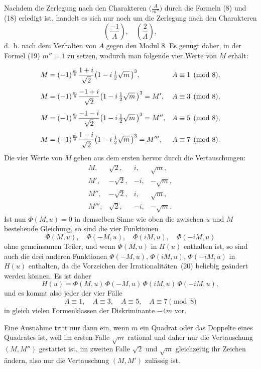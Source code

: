 \documentclass[12pt,a4paper]{article}
\theoremstyle{definition}
\begin{document}
Nachdem die Zerlegung nach den Charakteren $\bigl(\frac{A}{m''}\bigr)$ durch 
die Formeln (8) und (18) erledigt ist, handelt es sich nur noch um die 
Zerlegung nach den Charakteren
\[
\left(\frac{-1}{A}\right),\quad \left(\frac{2}{A}\right),
\]
d.~h. nach dem Verhalten von $A$ gegen den Modul $8$. Es genügt daher, in 
der Formel (19) $m'' = 1$ zu setzen, wodurch man folgende vier Werte von 
$M$ erhält:

\begin{align}
M &= (-1)^{\frac{m}{8}} \frac{1+i}{\sqrt{2}}
\bigl(1 - i\,\tfrac{1}{2}\sqrt{m}\,\bigr)^{3}, & A &\equiv 1 \pmod 8,\notag\\[4pt]
M &= (-1)^{\frac{m}{8}} \frac{-1+i}{\sqrt{2}}
\bigl(1 - i\,\tfrac{1}{2}\sqrt{m}\,\bigr)^{3} = M', & A &\equiv 3 \pmod 8,\notag\\[4pt]
M &= (-1)^{\frac{m}{8}} \frac{-1-i}{\sqrt{2}}
\bigl(1 - i\,\tfrac{1}{2}\sqrt{m}\,\bigr)^{3} = M'', & A &\equiv 5 \pmod 8,\notag\\[4pt]
M &= (-1)^{\frac{m}{8}} \frac{1-i}{\sqrt{2}}
\bigl(1 - i\,\tfrac{1}{2}\sqrt{m}\,\bigr)^{3} = M''', & A &\equiv 7 \pmod 8.
\end{align}
Die vier Werte von $M$ gehen aus dem ersten hervor durch die Vertauschungen:
\begin{equation}
\begin{array}{cccc}
M, & \sqrt{2}, & i, & \sqrt{m},\\
M', & -\sqrt{2}, & -i, & -\sqrt{m},\\
M'', & -\sqrt{2}, & i, & \sqrt{m},\\
M''', & \sqrt{2}, & -i, & -\sqrt{m}.
\end{array}
\end{equation}
Ist nun $\varPhi(M, u) = 0$ in demselben Sinne wie oben die zwischen $u$ und 
$M$ bestehende Gleichung, so sind die vier Funktionen
\[
\varPhi(M,u),\quad \varPhi(-M,u),\quad \varPhi(iM,u),\quad \varPhi(-iM,u)
\]
ohne gemeinsamen Teiler, und wenn $\varPhi(M,u)$ in $H(u)$ enthalten ist, so 
sind auch die drei anderen Funktionen $\varPhi(-M,u)$, $\varPhi(iM,u)$, 
$\varPhi(-iM,u)$ in $H(u)$ enthalten, da die Vorzeichen der 
Irrationalitäten~(20) beliebig geändert werden können. Es ist daher
\[
H(u) = \varPhi(M,u)\,\varPhi(-M,u)\,\varPhi(iM,u)\,\varPhi(-iM,u),
\]
und es kommt also jeder der vier Fälle
\[
A \equiv 1,\quad A \equiv 3,\quad A \equiv 5,\quad A \equiv 7 \pmod 8
\]
in gleich vielen Formenklassen der Diskriminante $-4m$ vor.

Eine Ausnahme tritt nur dann ein, wenn $m$ ein Quadrat oder das Doppelte 
eines Quadrates ist, weil im ersten Falle $\sqrt{m}$ rational und daher nur 
die Vertauschung $(M, M'')$ gestattet ist, im zweiten Falle $\sqrt{2}$ und 
$\sqrt{m}$ gleichzeitig ihr Zeichen ändern, also nur die Vertauschung 
$(M, M')$ zulässig ist.
\end{document}
